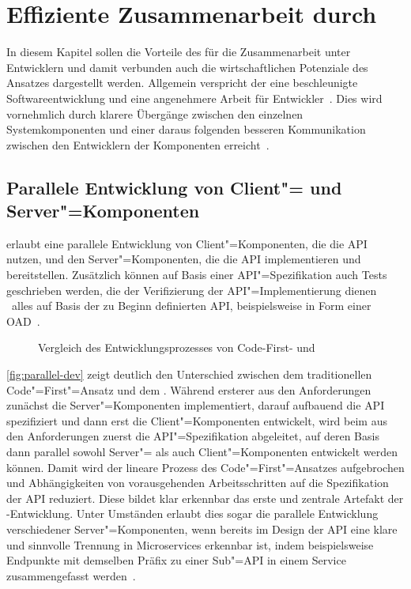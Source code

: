 \chapter{Effiziente Zusammenarbeit durch \AF}
In diesem Kapitel sollen die Vorteile des \AFAes für die Zusammenarbeit unter Entwicklern und damit verbunden auch die wirtschaftlichen Potenziale des Ansatzes dargestellt werden.
Allgemein verspricht der \AFA eine beschleunigte Softwareentwicklung und eine angenehmere Arbeit für Entwickler~\cite[354\psq]{de23}.
Dies wird vornehmlich durch klarere Übergänge zwischen den einzelnen Systemkomponenten und einer daraus folgenden besseren Kommunikation zwischen den Entwicklern der Komponenten erreicht~\cite[75]{bea22}.

\section{Parallele Entwicklung von Client"= und Server"=Komponenten} \label{sec:parallel-dev}
\AF erlaubt eine parallele Entwicklung von Client"=Komponenten, die die \ac{API} nutzen, und den Server"=Komponenten, die die \ac{API} implementieren und bereitstellen.
Zusätzlich können auf Basis einer \ac{API}"=Spezifikation auch Tests geschrieben werden, die der Verifizierung der \ac{API}"=Implementierung dienen \textendash\ alles auf Basis der zu Beginn definierten \ac{API}, beispielsweise in Form einer \ac{OAD}~\cite{vol22}.

\begin{figure}[hb]
	\centering
	\qquad
	\subfloat[\centering \AFA]{\label{fig:api-first}}
	\caption{Vergleich des Entwicklungsprozesses von Code-First- und \AFA}
	\label{fig:parallel-dev}
\end{figure}

\autoref{fig:parallel-dev} zeigt deutlich den Unterschied zwischen dem traditionellen Code"=First"=Ansatz und dem \AFA.
Während ersterer aus den Anforderungen zunächst die Server"=Komponenten implementiert, darauf aufbauend die \ac{API} spezifiziert und dann erst die Client"=Komponenten entwickelt, wird beim \AFA aus den Anforderungen zuerst die \ac{API}"=Spezifikation abgeleitet, auf deren Basis dann parallel sowohl Server"= als auch Client"=Komponenten entwickelt werden können.
Damit wird der lineare Prozess des Code"=First"=Ansatzes aufgebrochen und Abhängigkeiten von vorausgehenden Arbeitsschritten auf die Spezifikation der \ac{API} reduziert.
Diese bildet klar erkennbar das erste und zentrale Artefakt der \AF-Entwicklung.
Unter Umständen erlaubt dies sogar die parallele Entwicklung verschiedener Server"=Komponenten, wenn bereits im Design der \ac{API} eine klare und sinnvolle Trennung in Microservices erkennbar ist, indem beispielsweise Endpunkte mit demselben Präfix zu einer Sub"=\ac{API} in einem Service zusammengefasst werden~\cite[354]{de23}.

